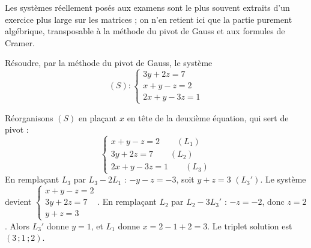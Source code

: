 \begin{annales}
Les systèmes réellement posés aux examens sont le plus souvent extraits d'un
exercice plus large sur les matrices ; on n'en retient ici que la partie
purement algébrique, transposable à la méthode du pivot de Gauss et aux
formules de Cramer.

Résoudre, par la méthode du pivot de Gauss, le système
\[
  (S) : \begin{cases} 3y+2z = 7 \\ x+y-z = 2 \\ 2x+y-3z = 1 \end{cases}
\]
\end{annales}

\begin{corrige}[annales]
Réorganisons $(S)$ en plaçant $x$ en tête de la deuxième équation, qui sert de
pivot :
\[
  \begin{cases}
    x+y-z = 2 \qquad (L_{1})\\
    3y+2z = 7 \qquad (L_{2})\\
    2x+y-3z = 1 \qquad (L_{3})
  \end{cases}
\]
En remplaçant $L_{3}$ par $L_{3}-2L_{1}$ : $-y-z = -3$, soit $y+z=3$
$(L_{3}')$. Le système devient
$\begin{cases} x+y-z=2 \\ 3y+2z=7 \\ y+z=3 \end{cases}$.
En remplaçant $L_{2}$ par $L_{2}-3L_{3}'$ : $-z = -2$, donc $z=2$. Alors
$L_{3}'$ donne $y=1$, et $L_{1}$ donne $x = 2-1+2 = 3$. Le triplet solution
est $(3\,;1\,;2)$.
\end{corrige}


